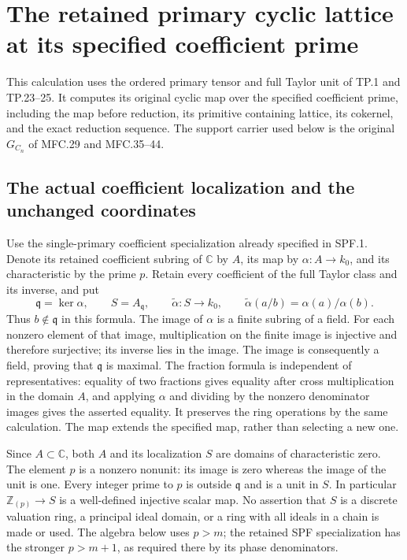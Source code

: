 \section{The retained primary cyclic lattice at its specified coefficient prime}
\label{sec:tcl}

This calculation uses the ordered primary tensor and full Taylor unit
of TP.1 and TP.23--25. It computes its original cyclic map over the
specified coefficient prime, including the map before reduction, its
primitive containing lattice, its cokernel, and the exact reduction
sequence. The support carrier used below is the original
\(G_{C_n}\) of MFC.29 and MFC.35--44.

\subsection{The actual coefficient localization and the unchanged coordinates}

Use the single-primary coefficient specialization already specified
in SPF.1. Denote its retained coefficient subring of \(\mathbb C\)
by \(A\), its map by \(\alpha:A\to k_0\), and its characteristic
by the prime \(p\). Retain every coefficient of the full Taylor
class and its inverse, and put
\[
 \mathfrak q=\ker\alpha,\qquad S=A_{\mathfrak q},\qquad
 \widetilde\alpha:S\longrightarrow k_0,\qquad
 \widetilde\alpha(a/b)=\alpha(a)/\alpha(b).
 \tag{TCL.1}\label{eq:tcl-ring}
\]
Thus \(b\notin\mathfrak q\) in this formula. The image of
\(\alpha\) is a finite subring of a field. For each nonzero element
of that image, multiplication on the finite image is injective and
therefore surjective; its inverse lies in the image. The image is
consequently a field, proving that \(\mathfrak q\) is maximal.
The fraction formula is independent of representatives: equality
of two fractions gives equality after cross multiplication in
the domain \(A\), and applying \(\alpha\) and dividing by the
nonzero denominator images gives the asserted equality.
It preserves the ring operations by the same calculation.
The map extends the specified map, rather than selecting a new one.

Since \(A\subset\mathbb C\), both \(A\) and its localization
\(S\) are domains of characteristic zero. The element \(p\) is
a nonzero nonunit: its image is zero whereas the image of the unit
is one. Every integer prime to \(p\) is outside \(\mathfrak q\)
and is a unit in \(S\). In particular \(\mathbb Z_{(p)}\to S\)
is a well-defined injective scalar map. No assertion that \(S\)
is a discrete valuation ring, a principal ideal domain, or a ring
with all ideals in a chain is made or used. The algebra below uses
\(p>m\); the retained SPF specialization has the stronger
\(p>m+1\), as required there by its phase denominators.

